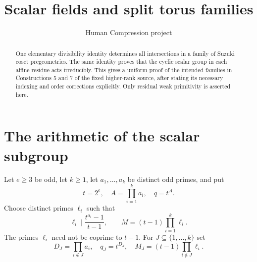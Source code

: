 \documentclass[11pt,a4paper]{article}
\title{Scalar fields and split torus families}
\author{Human Compression project}\date{}
\begin{document}
\maketitle
\begin{abstract}
One elementary divisibility identity determines all intersections in a
family of Suzuki coset pregeometries. The same identity proves that the
cyclic scalar group in each affine residue acts irreducibly. This gives
a uniform proof of the intended families in Constructions 5 and 7 of the
fixed higher-rank source, after stating its necessary indexing and order
corrections explicitly. Only residual weak primitivity is asserted here.
\end{abstract}

\section{The arithmetic of the scalar subgroup}
Let $e\ge3$ be odd, let $k\ge1$, let $a_1,\ldots,a_k$ be distinct odd primes, and put
\[
 t=2^e,\quad A=\prod_{i=1}^k a_i,\quad q=t^A.
\]
Choose distinct primes $\ell_i$ such that
\[
 \ell_i\mid\frac{t^{a_i}-1}{t-1},\qquad
 M=(t-1)\prod_{i=1}^k\ell_i.
\]
The primes $\ell_i$ need not be coprime to $t-1$.
For $J\subseteq\{1,\ldots,k\}$ set
\[
 D_J=\prod_{i\notin J}a_i,\quad q_J=t^{D_J},\quad
 M_J=(t-1)\prod_{i\notin J}\ell_i.
\]
\end{document}
